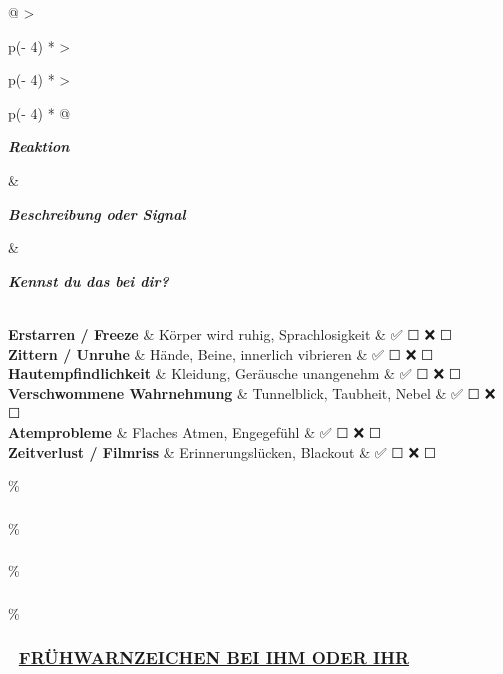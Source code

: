 \begin{longtable}[]{@{}
  >{\raggedright\arraybackslash}p{(\columnwidth - 4\tabcolsep) * }
  >{\raggedright\arraybackslash}p{(\columnwidth - 4\tabcolsep) * }
  >{\raggedright\arraybackslash}p{(\columnwidth - 4\tabcolsep) * }@{}}
\toprule\noalign{}
\begin{minipage}[b]{\linewidth}\raggedright
\emph{\textbf{Reaktion}}
\end{minipage} \& \begin{minipage}[b]{\linewidth}\raggedright
\emph{\textbf{Beschreibung oder Signal}}
\end{minipage} \& \begin{minipage}[b]{\linewidth}\raggedright
\emph{\textbf{Kennst du das bei dir?}}
\end{minipage} \\
\midrule\noalign{}
\endhead
\bottomrule\noalign{}
\endlastfoot
\textbf{Erstarren / Freeze} \& Körper wird ruhig, Sprachlosigkeit \& ✅ ☐ ❌ ☐ \\
\textbf{Zittern / Unruhe} \& Hände, Beine, innerlich vibrieren \& ✅ ☐ ❌ ☐ \\
\textbf{Hautempfindlichkeit} \& Kleidung, Geräusche unangenehm \& ✅ ☐ ❌ ☐ \\
\textbf{Verschwommene Wahrnehmung} \& Tunnelblick, Taubheit, Nebel \& ✅ ☐ ❌ ☐ \\
\textbf{Atemprobleme} \& Flaches Atmen, Engegefühl \& ✅ ☐ ❌ ☐ \\
\textbf{Zeitverlust / Filmriss} \& Erinnerungslücken, Blackout \& ✅ ☐ ❌ ☐ \\
\end{longtable}

\hypertarget{section}{\%
\subsubsection{}\label{section}}

\hypertarget{section-1}{\%
\subsubsection{}\label{section-1}}

\hypertarget{section-2}{\%
\subsubsection{}\label{section-2}}

\hypertarget{fruxfchwarnzeichen-bei-ihm-oder-ihr}{\%
\subsubsection{\texorpdfstring{\textbf{🧭 \ul{FRÜHWARNZEICHEN BEI IHM ODER IHR}}}{🧭 FRÜHWARNZEICHEN BEI IHM ODER IHR}}\label{fruxfchwarnzeichen-bei-ihm-oder-ihr}}

